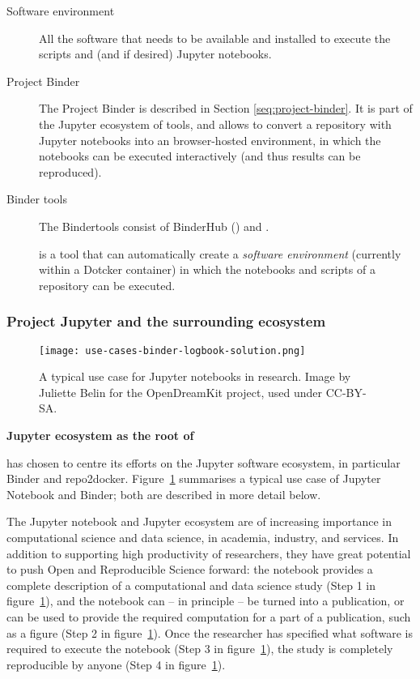 \begin{description}
\item[Software environment] All the software that needs to be available and
  installed to execute the scripts and (and if desired) Jupyter notebooks.

\item[Project Binder] The Project Binder is described in Section
\ref{seq:project-binder}. It is part of the Jupyter ecosystem of tools, and
allows to convert a repository with Jupyter notebooks into an browser-hosted
environment, in which the notebooks can be executed interactively (and thus
results can be reproduced). 

\item[Binder tools] The Bindertools consist of BinderHub () and
\repotodocker{}. 

\item[\repotodocker] \repotodocker{} is a tool that can automatically create a
\emph{software environment} (currently within a Dotcker container) in which the
notebooks and scripts of a repository can be executed. 
\end{description}


\subsubsection{Project Jupyter and the surrounding ecosystem}
\label{sec:project-jupyter}

\begin{figure}[htb]\centering
  \texttt{[image: use-cases-binder-logbook-solution.png]}
  \caption{A typical use case for Jupyter notebooks in research.
            Image by Juliette Belin for the OpenDreamKit project, used under
            CC-BY-SA.}\label{fig:use-cases-binder}
\end{figure}

\noindent\textbf{Jupyter ecosystem as the root of \TheProject}

\TheProject has chosen to centre its efforts on the Jupyter software
ecosystem, in particular Binder and repo2docker.
Figure~\ref{fig:use-cases-binder} summarises a typical use
case of Jupyter Notebook and Binder;
both are described in more detail below.

The Jupyter notebook and Jupyter ecosystem are of increasing
importance in computational science and data science, in academia,
industry, and services. In addition to supporting high productivity of
researchers, they have great potential to push Open and Reproducible Science forward:
the notebook provides a complete description of a computational and
data science study (Step 1 in figure~\ref{fig:use-cases-binder}), and the notebook can -- in principle -- be turned
into a publication, or can be used to provide the required computation
for a part of a publication, such as a figure
(Step 2 in figure~\ref{fig:use-cases-binder}). Once the researcher has
specified what software is required to execute the notebook (Step 3
in figure~\ref{fig:use-cases-binder}), the study is completely
reproducible by anyone (Step 4 in figure~\ref{fig:use-cases-binder}).

